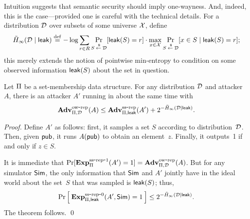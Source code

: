 Intuition suggests that semantic security should imply one-wayness. And, indeed, this is
the case---provided one is careful with the technical details.
For a distribution ${\cal D}$
over subsets of some universe ${\cal X}$, define
\[\tilde H_\infty({\cal D} \mid {\sf leak}) \stackrel{\rm def}{=} -\log \sum_{r \in R} \Pr_{S {\:\stackrel{{\scriptscriptstyle \hspace{0.2em}\$}} {\leftarrow}\:} {\cal D}}[{\sf leak}(S)=r] \cdot
\max_{x \in {\cal X}} \Pr_{S {\:\stackrel{{\scriptscriptstyle \hspace{0.2em}\$}} {\leftarrow}\:} {\cal D}}[x \in S \mid {\sf leak}(S)=r];\]
this merely extends the notion of pointwise min-entropy to condition on some
observed information ${\sf leak}(S)$ about the set in question.

\begin{theorem}
Let $\Pi$ be a set-membership data structure. For any distribution ${\cal D}$ and
attacker~$A$, there is an attacker $A'$ running in about the same time with
\[\mathrm{\mathbf{Adv}}^{\mathrm{ow\mbox{-}rep}}_{\Pi,\mathcal{D}}(A) \leq \mathrm{\mathbf{Adv}}^{\mathrm{ss\mbox{-}rep}}_{\Pi,{\sf
    leak}}(A') + 2^{-\tilde H_\infty({\cal D} \mid {\sf leak})}.\] 
\end{theorem}
\begin{proof}
Define $A'$ as follows: first, it samples a set $S$ according to
distribution~${\cal D}$. Then, given ${\sf pub}$, it runs $A({\sf pub})$ to obtain an element~$z$.
Finally, it outputs~1 if and only if $z \in S$.

It is immediate that $\Pr[\mathrm{\mathbf{Exp}}^{\mathrm{ss\mbox{-}rep\mbox{-}1}}_{\Pi}(A')=1] = \mathrm{\mathbf{Adv}}^{\mathrm{ow\mbox{-}rep}}_{\Pi,\mathcal{D}}(A)$.
But for any simulator ${\sf Sim}$,
the only information
that ${\sf Sim}$
and $A'$ jointly have in the ideal world
about the set~$S$ that was sampled is ${\sf leak}(S)$; thus,
\[\Pr\left[\: \mathrm{\mathbf{Exp}}^{\mathrm{ss\mbox{-}rep\mbox{-}0}}_{\Pi,{\sf leak}}(A', {\sf Sim})=1 \:\right] \leq
2^{-\tilde H_\infty({\cal D} \mid {\sf leak})}.\]
The theorem follows. \hfill\qed
\end{proof}




